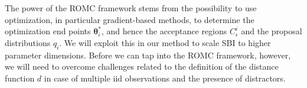 \documentclass[twoside]{article}
\newcommand{\thb}{\boldsymbol{\theta}}
\newcommand{\ub}{\mathbf{u}}
\newcommand{\data}{\mathbf{y}^o}
\newcommand{\accregioni}{C_{\epsilon}^i}
\newcommand{\E}{\mathbb{E}}
\begin{document}
The power of the ROMC framework stems from the possibility to use optimization, in particular gradient-based methods, to determine the optimization end points $\thb_i^*$, and hence the acceptance regions $\accregioni$ and the proposal distributions $q_i$. We will exploit this in our method to scale SBI to higher parameter dimensions. Before we can tap into the ROMC framework, however, we will need to overcome challenges related to the definition of the distance function $d$ in case of multiple iid observations and the presence of distractors.



\end{document}
